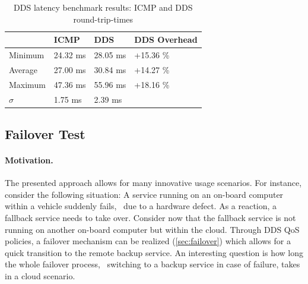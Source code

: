 \begin{table}[H]
  \caption[DDS latecy benchmark results]{DDS latency benchmark results: ICMP and DDS round-trip-times}\label{tab:dds-latency}
  \centering
  \begin{tabular}{p{} | p{} p{} | p{}}
    \toprule
       & \textbf{ICMP} & \textbf{DDS} & \textbf{DDS Overhead} \\
    \midrule
    	Minimum & 24.32 ms & 28.05 ms & +15.36 \%\\
    	Average & 27.00 ms & 30.84 ms & +14.27 \%\\
    	Maximum & 47.36 ms & 55.96 ms & +18.16 \% \\
    	$\sigma$ & 1.75 ms & 2.39 ms &\\
    \bottomrule
  \end{tabular}
\end{table}
%
%
%
%
%
%
%
%
%
%
\subsection{Failover Test}\label{sec:failovertest}
\paragraph{Motivation.} The presented approach allows for many innovative usage scenarios. For instance, consider the following situation: A service running on an on-board computer within a vehicle suddenly fails, \eg\ due to a hardware defect. As a reaction, a fallback service needs to take over. Consider now that the fallback service is not running on another on-board computer but within the cloud. Through DDS QoS policies, a failover mechanism can be realized (\cf \ref{sec:failover}) which allows for a quick transition to the remote backup service. An interesting question is how long the whole failover process, \ie\ switching to a backup service in case of failure, takes in a cloud scenario.

